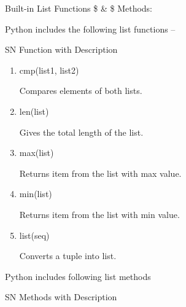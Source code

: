 Built-in List Functions  \$  \&  \$ Methods: \par
Python includes the following list functions – \par
\vspace{12pt}
SN \hspace*{0.5in} Function with Description \par
\begin{enumerate}
\item \hspace*{0.5in} cmp(list1, list2) \par
\vspace{12pt}
Compares elements of both lists. \par
\item \hspace*{0.5in} len(list) \par
\vspace{12pt}
Gives the total length of the list. \par
\item \hspace*{0.5in} max(list) \par
\vspace{12pt}
Returns item from the list with max value. \par
\item \hspace*{0.5in} min(list) \par
\vspace{12pt}
Returns item from the list with min value. \par
\item \hspace*{0.5in} list(seq) \par
\vspace{12pt}
Converts a tuple into list. \par
\end{enumerate}
Python includes following list methods \par
SN \hspace*{0.5in} Methods with Description \par
